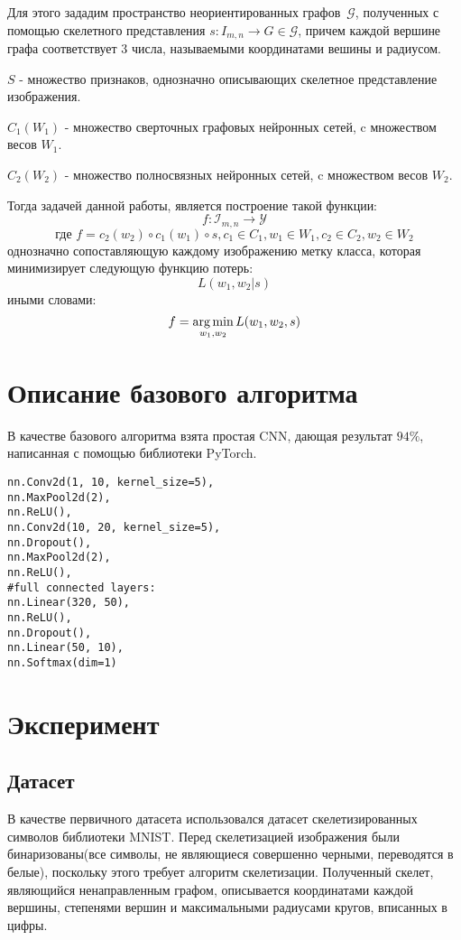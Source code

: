 \documentclass[12pt, twoside]{article}
\begin{document}
Для этого зададим пространство неориентированных графов~$\mathcal{G}$, полученных с помощью скелетного представления $s : I_{m,n} \to G \in \mathcal{G}$, причем каждой вершине графа соответствует 3 числа, называемыми координатами вешины и радиусом.

$S$ - множество признаков, однозначно описывающих скелетное представление изображения.

$C_1(W_1)$ - множество сверточных графовых нейронных сетей, c множеством весов $W_1$.

$C_2(W_2)$ - множество полносвязных нейронных сетей, c множеством весов $W_2$.

Тогда задачей данной работы, является построение такой функции: $$f : \mathcal{I}_{m,n} \to \mathcal{Y}$$ $$ \text{где } f = c_2(w_2) \circ c_1(w_1) \circ s, c_1 \in C_1, w_1 \in W_1, c_2 \in C_2, w_2 \in W_2$$ однозначно сопоставляющую каждому изображению метку класса, которая минимизирует следующую функцию потерь: $$L(w_1, w_2 | s) $$ иными словами: $$f = \argmin_{w_1, w_2} L(w_1, w_2, s) $$

\section{Описание базового алгоритма}
В качестве базового алгоритма взята простая CNN, дающая результат $94\%$, написанная с помощью библиотеки PyTorch.
\begin{verbatim} 
nn.Conv2d(1, 10, kernel_size=5),
nn.MaxPool2d(2),
nn.ReLU(),
nn.Conv2d(10, 20, kernel_size=5),
nn.Dropout(),
nn.MaxPool2d(2),
nn.ReLU(),
#full connected layers:
nn.Linear(320, 50),
nn.ReLU(),
nn.Dropout(),
nn.Linear(50, 10),
nn.Softmax(dim=1)

\end{verbatim}

\section{Эксперимент}
\subsection{Датасет}
В качестве первичного датасета использовался датасет скелетизированных символов библиотеки MNIST. Перед скелетизацией изображения были бинаризованы(все символы, не являющиеся совершенно черными, переводятся в белые), поскольку этого требует алгоритм скелетизации. Полученный скелет, являющийся ненаправленным графом, описывается координатами каждой вершины, степенями вершин и максимальными радиусами кругов, вписанных в цифры.
\end{document}
